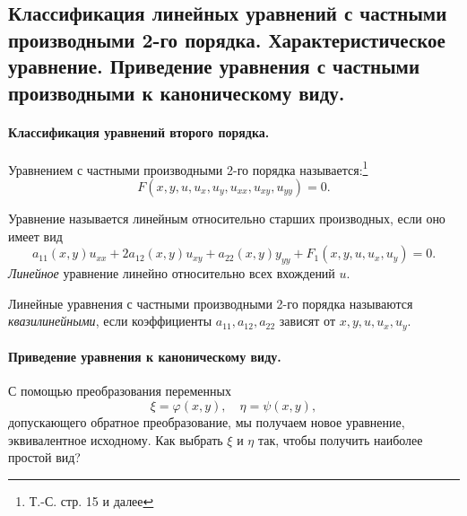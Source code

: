 \subsection{Классификация линейных уравнений с частными производными 2-го порядка. Характеристическое уравнение. Приведение уравнения с частными производными к каноническому виду.}
\label{sec:types}


\paragraph{Классификация уравнений второго порядка.}
Уравнением с частными производными 2-го порядка называется:\footnote{Т.-С. стр. 15 и далее}
\begin{equation}
	F(x, y, u, u_x, u_y, u_{xx}, u_{xy}, u_{yy}) = 0.
\end{equation}

Уравнение называется линейным относительно старших производных, если оно имеет вид
\begin{equation} \label{SOlineq}
	a_{11}(x, y) u_{xx} + 2 a_{12}(x, y) u_{xy} + a_{22}(x, y) y_{yy} + F_1(x, y, u, u_x, u_y) = 0.
\end{equation}
\textit{Линейное} уравнение линейно относительно всех вхождений $u$. 

Линейные уравнения с частными производными 2-го порядка называются \textit{квазилинейными}, если коэффициенты $a_{11}, a_{12}, a_{22}$ зависят от $x, y, u, u_x, u_y$. 

\paragraph{Приведение уравнения к каноническому виду.}
С помощью преобразования переменных
\begin{equation*}
	\xi = \varphi(x, y), \quad \eta = \psi(x, y),
\end{equation*}
допускающего обратное преобразование, мы получаем новое уравнение, эквивалентное исходному. Как выбрать $\xi$ и $\eta$ так, чтобы получить наиболее простой вид?

